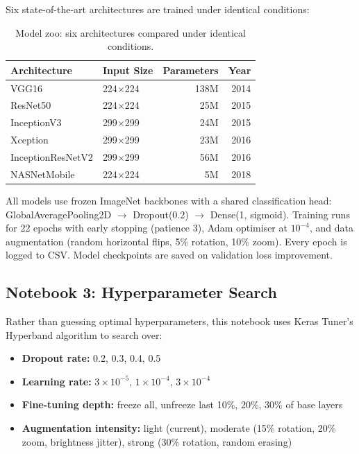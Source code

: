 Six state-of-the-art architectures are trained under identical conditions:

\begin{table}[H]
\centering
\caption{Model zoo: six architectures compared under identical conditions.}
\label{tab:model_zoo}
\begin{tabular}{llrr}
\toprule
\textbf{Architecture} & \textbf{Input Size} & \textbf{Parameters} & \textbf{Year} \\
\midrule
VGG16              & 224$\times$224 & 138M & 2014 \\
ResNet50           & 224$\times$224 & 25M  & 2015 \\
InceptionV3        & 299$\times$299 & 24M  & 2015 \\
Xception           & 299$\times$299 & 23M  & 2016 \\
InceptionResNetV2  & 299$\times$299 & 56M  & 2016 \\
NASNetMobile       & 224$\times$224 & 5M   & 2018 \\
\bottomrule
\end{tabular}
\end{table}

All models use frozen ImageNet backbones with a shared classification head: GlobalAveragePooling2D $\rightarrow$ Dropout(0.2) $\rightarrow$ Dense(1, sigmoid). Training runs for 22 epochs with early stopping (patience 3), Adam optimiser at $10^{-4}$, and data augmentation (random horizontal flips, 5\% rotation, 10\% zoom). Every epoch is logged to CSV. Model checkpoints are saved on validation loss improvement.

\subsection{Notebook 3: Hyperparameter Search}

Rather than guessing optimal hyperparameters, this notebook uses Keras Tuner's Hyperband algorithm to search over:

\begin{itemize}
    \item \textbf{Dropout rate:} 0.2, 0.3, 0.4, 0.5
    \item \textbf{Learning rate:} $3 \times 10^{-5}$, $1 \times 10^{-4}$, $3 \times 10^{-4}$
    \item \textbf{Fine-tuning depth:} freeze all, unfreeze last 10\%, 20\%, 30\% of base layers
    \item \textbf{Augmentation intensity:} light (current), moderate (15\% rotation, 20\% zoom, brightness jitter), strong (30\% rotation, random erasing)
\end{itemize}


